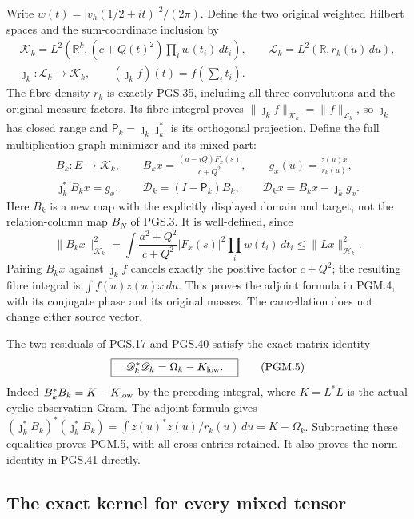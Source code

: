 Write \(w(t)=|v_h(1/2+it)|^2/(2\pi)\). Define the two original
weighted Hilbert spaces and the sum-coordinate inclusion by
\[
\begin{gathered}
 \mathscr K_k=L^2\left(\mathbb R^k,
                   (c+Q(t)^2)\prod_i w(t_i)\,dt_i\right),\qquad
 \mathscr L_k=L^2(\mathbb R,r_k(u)\,du),\\
 \jmath_k:\mathscr L_k\longrightarrow\mathscr K_k,\qquad
          (\jmath_k f)(t)=f\left(\sum_i t_i\right).
\end{gathered}
\tag{PGM.3}\label{eq:pgm-hilbert}
\]
The fibre density \(r_k\) is exactly PGS.35, including all three
convolutions and the original measure factors. Its fibre integral
proves \(\|\jmath_k f\|_{\mathscr K_k}=\|f\|_{\mathscr L_k}\),
so \(\jmath_k\) has closed range and
\(\mathsf P_k=\jmath_k\jmath_k^*\) is its orthogonal projection.
Define the full multiplication-graph minimizer and its mixed part:
\[
\begin{gathered}
 B_k:E\longrightarrow\mathscr K_k,\qquad
 B_kx=\frac{(a-iQ)F_x(s)}{c+Q^2},\qquad
 g_x(u)=\frac{z(u)x}{r_k(u)},\\
 \jmath_k^*B_kx=g_x,\qquad
 \mathscr D_k=(I-\mathsf P_k)B_k,\qquad
 \mathscr D_kx=B_kx-\jmath_k g_x .
\end{gathered}
\tag{PGM.4}\label{eq:pgm-map}
\]
Here \(B_k\) is a new map with the explicitly displayed domain and
target, not the relation-column map \(B_N\) of PGS.3. It is
well-defined, since
\[
 \|B_kx\|_{\mathscr K_k}^2
 =\int\frac{a^2+Q^2}{c+Q^2}|F_x(s)|^2\prod_iw(t_i)\,dt_i
 \leq\|Lx\|_{\mathscr H_k}^2.
\]
Pairing \(B_kx\) against \(\jmath_k f\) cancels exactly the
positive factor \(c+Q^2\); the resulting fibre integral is
\(\int\overline{f(u)}z(u)x\,du\). This proves the adjoint
formula in PGM.4, with its conjugate phase and its original masses.
The cancellation does not change either source vector.

The two residuals of PGS.17 and PGS.40 satisfy the exact matrix
identity
\[
 \boxed{\quad \mathscr D_k^*\mathscr D_k
                       =\Omega_k-K_{\rm low}.\quad}
 \tag{PGM.5}\label{eq:pgm-gram}
\]
Indeed \(B_k^*B_k=K-K_{\rm low}\) by the preceding integral,
where \(K=L^*L\) is the actual cyclic observation Gram.
The adjoint formula gives
\((\jmath_k^*B_k)^*(\jmath_k^*B_k)=
\int z(u)^*z(u)/r_k(u)\,du=K-\Omega_k\).
Subtracting these equalities proves PGM.5, with all cross entries
retained. It also proves the norm identity in PGS.41 directly.

\subsection{The exact kernel for every mixed tensor}

